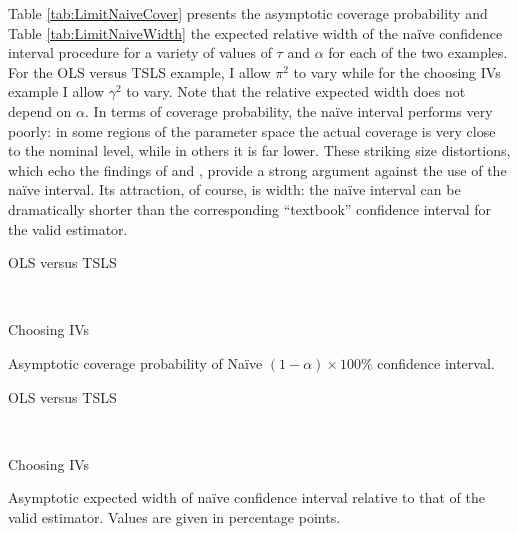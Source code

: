 Table \ref{tab:LimitNaiveCover} presents the asymptotic coverage probability and Table \ref{tab:LimitNaiveWidth} the expected relative width of the na\"{i}ve confidence interval procedure for a variety of values of $\tau$ and $\alpha$ for each of the two examples.
For the OLS versus TSLS example, I allow $\pi^2$ to vary while for the choosing IVs example I allow $\gamma^2$ to vary.
Note that the relative expected width does not depend on $\alpha$.
In terms of coverage probability, the na\"{i}ve interval performs very poorly: in some regions of the parameter space the actual coverage is very close to the nominal level, while in others it is far lower.
These striking size distortions, which echo the findings of \cite{Guggenberger2010} and \cite{Guggenberger2012}, provide a strong argument against the use of the na\"{i}ve interval.
Its attraction, of course, is width: the na\"{i}ve interval can be dramatically shorter than the corresponding ``textbook'' confidence interval for the valid estimator.

\begin{table}[h]
  \centering
  \begin{subtable}{0.48\textwidth}
    \caption{OLS versus TSLS}
    
  \end{subtable}
  ~
  \begin{subtable}{0.48\textwidth}
    \caption{Choosing IVs}
    
  \end{subtable}
  \caption{Asymptotic coverage probability of Na\"{i}ve $(1-\alpha)\times 100\%$ confidence interval.}
  \label{tab:LimitNaiveCover}
\end{table}

\begin{table}[h]
  \centering
  \begin{subtable}{0.48\textwidth}
    \caption{OLS versus TSLS}
    
  \end{subtable}
  ~
  \begin{subtable}{0.48\textwidth}
    \caption{Choosing IVs}
    
  \end{subtable}
  \caption{Asymptotic expected width of na\"{i}ve confidence interval relative to that of the valid estimator. Values are given in percentage points.}
  \label{tab:LimitNaiveWidth}
\end{table}

